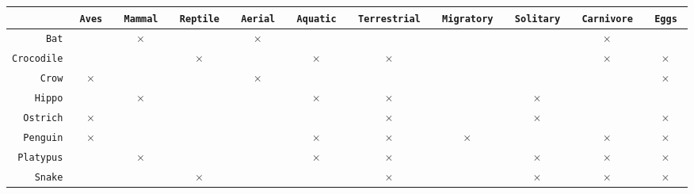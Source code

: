 \begin{small}
    \begin{table}[h]
        \centering
        \begin{tabular}{r|c c c c c c c c c c }
                               & \texttt{ Aves } & \texttt{ Mammal } & \texttt{ Reptile } & \texttt{ Aerial } & \texttt{ Aquatic } & \texttt{ Terrestrial } & \texttt{ Migratory } & \texttt{ Solitary } & \texttt{ Carnivore } & \texttt{ Eggs } \\
            \hline
            \texttt{Bat}       &                 & $\times$          &                    & $\times$          &                    &                        &                      &                     & $\times$             &                 \\
            \texttt{Crocodile} &                 &                   & $\times$           &                   & $\times$           & $\times$               &                      &                     & $\times$             & $\times$        \\
            \texttt{Crow}      & $\times$        &                   &                    & $\times$          &                    &                        &                      &                     &                      & $\times$        \\
            \texttt{Hippo}     &                 & $\times$          &                    &                   & $\times$           & $\times$               &                      & $\times$            &                      &                 \\
            \texttt{Ostrich}   & $\times$        &                   &                    &                   &                    & $\times$               &                      & $\times$            &                      & $\times$        \\
            \texttt{Penguin}   & $\times$        &                   &                    &                   & $\times$           & $\times$               & $\times$             &                     & $\times$             & $\times$        \\
            \texttt{Platypus}  &                 & $\times$          &                    &                   & $\times$           & $\times$               &                      & $\times$            & $\times$             & $\times$        \\
            \texttt{Snake}     &                 &                   & $\times$           &                   &                    & $\times$               &                      & $\times$            & $\times$             & $\times$        \\

\end{tabular}
\end{table}
\end{small}
